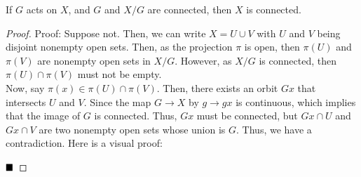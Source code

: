  
\begin{lemma}
    If $G$ acts on $X$, and $G$ and $X / G$ are connected, then $X$ is connected. 
\end{lemma}
\begin{proof}{Proof:}
    Suppose not. Then, we can write $X = U \cup V$ with $U$ and $V$ being disjoint nonempty open sets. Then, as the projection $\pi$ is open, then $\pi(U)$ and $\pi(V)$ are nonempty open sets in $X / G$. However, as $X / G$ is connected, then $\pi(U) \cap \pi(V)$ must not be empty.\\
    
    Now, say $\pi(x) \in \pi(U) \cap \pi(V)$. Then, there exists an orbit $Gx$ that intersects $U$ and $V$. Since the map $G \to X$ by $g \to gx$ is continuous, which implies that the image of $G$ is connected. Thus, $Gx$ must be connected, but $Gx \cap U$ and $Gx \cap V$ are two nonempty open sets whose union is $G$. Thus, we have a contradiction. Here is a visual proof:


    $\qed$
\end{proof}
